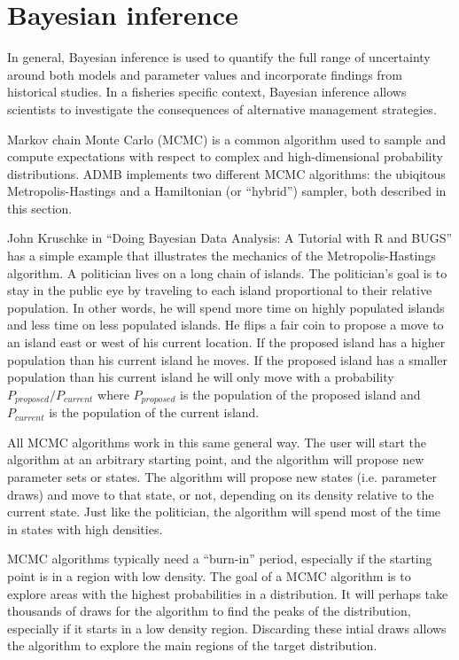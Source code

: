 \documentclass{article}\usepackage[]{graphicx}\usepackage[]{color}
\begin{document}
\section{Bayesian inference}
In general, Bayesian inference is used to quantify the full
range of uncertainty around both models and parameter values
and incorporate findings from historical studies. In a
fisheries specific context, Bayesian inference allows
scientists to investigate the consequences of alternative
management strategies.

Markov chain Monte Carlo (MCMC) is a common algorithm used
to sample and compute expectations with respect to complex
and high-dimensional probability distributions.  ADMB
implements two different MCMC algorithms: the ubiqitous
Metropolis-Hastings and a Hamiltonian (or ``hybrid'')
sampler, both described in this section.

John Kruschke in ``Doing Bayesian Data Analysis: A Tutorial
with R and BUGS'' has a simple example that illustrates the
mechanics of the Metropolis-Hastings algorithm. A politician
lives on a long chain of islands. The politician's goal is
to stay in the public eye by traveling to each island
proportional to their relative population. In other words,
he will spend more time on highly populated islands and less
time on less populated islands. He flips a fair coin to
propose a move to an island east or west of his current
location. If the proposed island has a higher population
than his current island he moves. If the proposed island has
a smaller population than his current island he will only
move with a probability $P_{proposed} / P_{current}$ where
$P_{proposed}$ is the population of the proposed island and
$P_{current}$ is the population of the current island.

All MCMC algorithms work in this same general way. The user
will start the algorithm at an arbitrary starting point, and
the algorithm will propose new parameter sets or states. The
algorithm will propose new states (i.e. parameter draws) and
move to that state, or not, depending on its density
relative to the current state. Just like the politician, the
algorithm will spend most of the time in states with high
densities.

MCMC algorithms typically need a ``burn-in'' period,
especially if the starting point is in a region with low
density. The goal of a MCMC algorithm is to explore areas
with the highest probabilities in a distribution. It will
perhaps take thousands of draws for the algorithm to find
the peaks of the distribution, especially if it starts in a
low density region. Discarding these intial draws allows the
algorithm to explore the main regions of the target
distribution.
\end{document}
